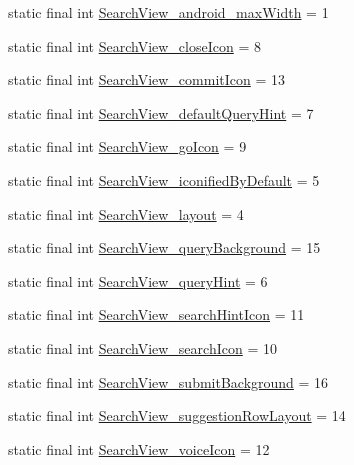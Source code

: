 \begin{DoxyCompactItemize}
static final int \hyperlink{classproject4_1_1xaria_1_1R_1_1styleable_a3639cb45230c4e71f0cc02947e9eda85}{Search\+View\+\_\+android\+\_\+max\+Width} = 1
\item 
static final int \hyperlink{classproject4_1_1xaria_1_1R_1_1styleable_a5a61b07ff3f067c74cabaac20104da1b}{Search\+View\+\_\+close\+Icon} = 8
\item 
static final int \hyperlink{classproject4_1_1xaria_1_1R_1_1styleable_a63519a27d7991d2eae6ff9cf06953242}{Search\+View\+\_\+commit\+Icon} = 13
\item 
static final int \hyperlink{classproject4_1_1xaria_1_1R_1_1styleable_a2e66e2926f9bd975328f388c70fde340}{Search\+View\+\_\+default\+Query\+Hint} = 7
\item 
static final int \hyperlink{classproject4_1_1xaria_1_1R_1_1styleable_a722e570aa508bd7cec45f03da9ac5f29}{Search\+View\+\_\+go\+Icon} = 9
\item 
static final int \hyperlink{classproject4_1_1xaria_1_1R_1_1styleable_a4ef3397cc9442515802ffefa9ec8123e}{Search\+View\+\_\+iconified\+By\+Default} = 5
\item 
static final int \hyperlink{classproject4_1_1xaria_1_1R_1_1styleable_a3779c51813ae088ff27ef4c0c40ba410}{Search\+View\+\_\+layout} = 4
\item 
static final int \hyperlink{classproject4_1_1xaria_1_1R_1_1styleable_a56c5e64109ae3a3635dabc3c9c16287c}{Search\+View\+\_\+query\+Background} = 15
\item 
static final int \hyperlink{classproject4_1_1xaria_1_1R_1_1styleable_a7d9e5ac551e8a001fcbe2c8b814a3573}{Search\+View\+\_\+query\+Hint} = 6
\item 
static final int \hyperlink{classproject4_1_1xaria_1_1R_1_1styleable_a7091bc68f8b0059447de84bf2a752de5}{Search\+View\+\_\+search\+Hint\+Icon} = 11
\item 
static final int \hyperlink{classproject4_1_1xaria_1_1R_1_1styleable_a755d82e19c508ecb70f34634e682bb28}{Search\+View\+\_\+search\+Icon} = 10
\item 
static final int \hyperlink{classproject4_1_1xaria_1_1R_1_1styleable_a0f597ce0d22c799517c8d6d3e194a1c0}{Search\+View\+\_\+submit\+Background} = 16
\item 
static final int \hyperlink{classproject4_1_1xaria_1_1R_1_1styleable_ac24e80493308e5cd30e2dfffff0bec9d}{Search\+View\+\_\+suggestion\+Row\+Layout} = 14
\item 
static final int \hyperlink{classproject4_1_1xaria_1_1R_1_1styleable_a4e40fdd0fa9bcc88e6f7800e6542d8ce}{Search\+View\+\_\+voice\+Icon} = 12

\end{DoxyCompactItemize}
